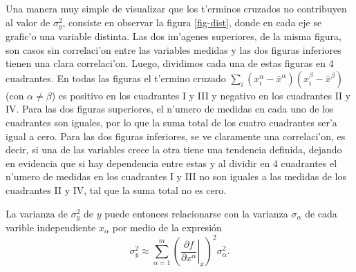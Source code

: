 Una manera muy simple de visualizar que los t'erminos cruzados no contribuyen al valor de $\sigma_y^2$, consiste en observar la figura \ref{fig-dist}, donde en cada eje se grafic'o una variable distinta. Las dos im'agenes superiores, de la misma figura, son casos sin correlaci'on entre las variables medidas y las dos figuras inferiores tienen una clara correlaci'on. 
Luego, dividimos cada una de estas figuras en 4 cuadrantes. En todas las figuras el t'ermino cruzado $\sum_i(x_i^\alpha-\bar{x}^\alpha)(x_i^\beta-\bar{x}^\beta)$ (con $\alpha\neq\beta$) es positivo en los cuadrantes I y III y negativo en los cuadrantes II y IV. 
Para las dos figuras superiores, el n'umero de medidas en cada uno de los cuadrantes son iguales, por lo que la suma total de los cuatro cuadrantes ser'a igual a cero. 
Para las dos figuras inferiores, se ve claramente una correlaci'on, es decir, si una de las variables crece la otra tiene una tendencia definida, dejando en evidencia que si hay dependencia entre estas y al dividir en 4 cuadrantes el n'umero de medidas en los cuadrantes I y III no son iguales a las medidas de los cuadrantes II y IV, tal que la suma total no es cero. 

La varianza de $\sigma_y^2$ de $y$ puede entonces relacionarse con la varianza $\sigma_\alpha$ de cada varible independiente $x_\alpha$ por medio de la expresión
\begin{equation}\label{pe}
\sigma_y^2\approx\sum_{\alpha=1}^m\left(\left.\frac{\partial f}{\partial x^\alpha}\right|_{\bar{x}}\right)^2\sigma_\alpha^2.
\end{equation}

